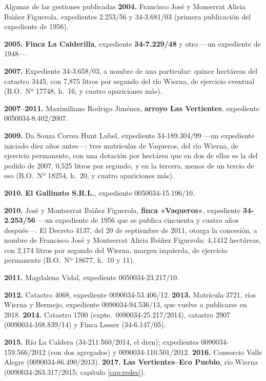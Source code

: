 \begin{ficha}{Algunas de las gestiones publicadas}
\textbf{2004.} Francisco José y Monserrat Alicia Ibáñez Figuerola, expedientes 2.253/56 y 34-3.681/03 (primera publicación del expediente de 1956).

\textbf{2005.} \textbf{Finca La Calderilla}, expediente \textbf{34-7.229/48} y otro ---un expediente de 1948---.

\textbf{2007.} Expediente 34-3.658/03, a nombre de una particular: quince hectáreas del catastro 3445, con 7,875 litros por segundo del río Wierna, de ejercicio eventual (B.O.\ Nº 17748, h.\ 16, y cuatro apariciones más).

\textbf{2007--2011.} Maximiliano Rodrigo Jiménez, \textbf{arroyo Las Vertientes}, expediente
0050034-8.402/2007.

\textbf{2009.} Da Souza Correa Hunt Lubel, expediente 34-189.304/99 ---un expediente iniciado
diez años antes---: tres matrículas de Vaqueros, del río Wierna, de ejercicio permanente, con una dotación por hectárea que en dos de ellas es la del pedido de 2007, 0,525 litros por segundo, y en la tercera, menos de un tercio de eso (B.O.\ Nº 18254, h.\ 20, y cuatro apariciones más).

\textbf{2010.} \textbf{El Gallinato S.R.L.}, expediente 0050034-15.196/10.

\textbf{2010.} José y Montserrat Ibáñez Figuerola, \textbf{finca «Vaqueros»}, expediente
\textbf{34-2.253/56} ---un expediente de 1956 que se publica cincuenta y cuatro años después---. El Decreto 4137, del 20 de septiembre de 2011, otorga la concesión, a nombre de Francisco José y Montserrat Alicia Ibáñez Figuerola: 4,1412 hectáreas, con 2,174 litros por segundo del Wierna, margen izquierda, de ejercicio permanente (B.O.\ Nº 18677, h.\ 10 y 11).

\textbf{2011.} Magdalena Vidal, expediente 0050034-23.217/10.

\textbf{2012.} Catastro 4068, expediente 0090034-53.406/12. \textbf{2013.} Matrícula 3721, ríos Wierna y Bermejo, expediente 0090034-94.536/13, que vuelve a publicarse en 2018. \textbf{2014.} Catastro 1700 (expte.\ 0090034-25.217/2014), catastro 2907 (0090034-168.839/14) y Finca Lesser (34-6.147/05).

\textbf{2015.} Río La Caldera (34-211.560/2014, el dren); expedientes 0090034-159.566/2012 (con dos agregados) y 0090034-110.501/2012. \textbf{2016.} Consorcio Valle Alegre (0090034-86.490/2013). \textbf{2017.} \textbf{Las Vertientes--Eco Pueblo}, río Wierna (0090034-263.317/2015; capítulo \ref{cap:redes}).


\end{ficha}
